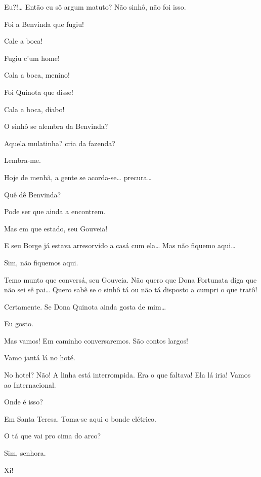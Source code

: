  Eu?!\ldots{} Então eu sô argum matuto? Não sinhô, não foi isso.

 Foi a Benvinda que fugiu!

 Cale a boca!

 Fugiu c’um home!

 Cala a boca, menino!

 Foi Quinota que disse!

 Cala a boca, diabo!

 O sinhô se alembra da Benvinda?

 Aquela mulatinha? cria da fazenda?

 Lembra-me.

 Hoje de menhã, a gente se acorda-se\ldots{} precura\ldots{}

 Quê dê Benvinda?

 Pode ser que ainda a encontrem.

 Mas em que estado, seu Gouveia!

 E seu Borge já estava arresorvido a casá cum ela\ldots{} Mas não
fiquemo aqui\ldots{}

  Sim, não fiquemos aqui.

 Temo munto que conversá, seu Gouveia. Não quero que Dona
Fortunata diga que não sei sê pai\ldots{} Quero sabê se o sinhô tá ou não tá
disposto a cumpri o que tratô!

 Certamente. Se Dona Quinota ainda gosta de mim\ldots{}

  Eu gosto.

 Mas vamos! Em caminho conversaremos. São contos largos!

 Vamo jantá lá no hoté.

 No hotel? Não! A linha está interrompida.  Era o que
faltava! Ela lá iria!  Vamos ao Internacional.

 Onde é isso?

 Em Santa Teresa. Toma-se aqui o bonde elétrico.

 O tá que vai pro cima do arco?

 Sim, senhora.

 Xi!

